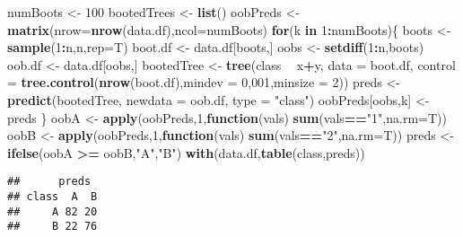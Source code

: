 \documentclass[]{article}
\newenvironment{Shaded}{\begin{snugshade}}{\end{snugshade}}
\newcommand{\ControlFlowTok}[1]{\textcolor[rgb]{0.13,0.29,0.53}{\textbf{#1}}}
\newcommand{\DataTypeTok}[1]{\textcolor[rgb]{0.13,0.29,0.53}{#1}}
\newcommand{\DecValTok}[1]{\textcolor[rgb]{0.00,0.00,0.81}{#1}}
\newcommand{\KeywordTok}[1]{\textcolor[rgb]{0.13,0.29,0.53}{\textbf{#1}}}
\newcommand{\NormalTok}[1]{#1}
\newcommand{\OperatorTok}[1]{\textcolor[rgb]{0.81,0.36,0.00}{\textbf{#1}}}
\newcommand{\StringTok}[1]{\textcolor[rgb]{0.31,0.60,0.02}{#1}}
\begin{document}
\begin{Shaded}
\begin{Highlighting}[]
\NormalTok{numBoots <-}\StringTok{ }\DecValTok{100}
\NormalTok{bootedTrees <-}\StringTok{ }\KeywordTok{list}\NormalTok{()}
\NormalTok{oobPreds <-}\StringTok{ }\KeywordTok{matrix}\NormalTok{(}\DataTypeTok{nrow=}\KeywordTok{nrow}\NormalTok{(data.df),}\DataTypeTok{ncol=}\NormalTok{numBoots) }
\ControlFlowTok{for}\NormalTok{(k }\ControlFlowTok{in} \DecValTok{1}\OperatorTok{:}\NormalTok{numBoots)\{}
\NormalTok{  boots <-}\StringTok{ }\KeywordTok{sample}\NormalTok{(}\DecValTok{1}\OperatorTok{:}\NormalTok{n,n,}\DataTypeTok{rep=}\NormalTok{T) }
\NormalTok{  boot.df <-}\StringTok{ }\NormalTok{data.df[boots,]}
\NormalTok{  oobs <-}\StringTok{ }\KeywordTok{setdiff}\NormalTok{(}\DecValTok{1}\OperatorTok{:}\NormalTok{n,boots) }
\NormalTok{  oob.df <-}\StringTok{ }\NormalTok{data.df[oobs,] }
\NormalTok{  bootedTree <-}\StringTok{ }\KeywordTok{tree}\NormalTok{(class }\OperatorTok{~}\StringTok{ }\NormalTok{x}\OperatorTok{+}\NormalTok{y,}
                     \DataTypeTok{data =}\NormalTok{ boot.df,}
                     \DataTypeTok{control =} \KeywordTok{tree.control}\NormalTok{(}\KeywordTok{nrow}\NormalTok{(boot.df),}\DataTypeTok{mindev =} \DecValTok{0}\NormalTok{,}\DecValTok{001}\NormalTok{,}\DataTypeTok{minsize =} \DecValTok{2}\NormalTok{))}
\NormalTok{  preds <-}\StringTok{ }\KeywordTok{predict}\NormalTok{(bootedTree,}
                   \DataTypeTok{newdata =}\NormalTok{ oob.df,}
                   \DataTypeTok{type =} \StringTok{"class"}\NormalTok{)}
\NormalTok{  oobPreds[oobs,k] <-}\StringTok{ }\NormalTok{preds}
\NormalTok{\}}
\NormalTok{oobA <-}\StringTok{ }\KeywordTok{apply}\NormalTok{(oobPreds,}\DecValTok{1}\NormalTok{,}\ControlFlowTok{function}\NormalTok{(vals) }\KeywordTok{sum}\NormalTok{(vals}\OperatorTok{==}\StringTok{"1"}\NormalTok{,}\DataTypeTok{na.rm=}\NormalTok{T)) }
\NormalTok{oobB <-}\StringTok{ }\KeywordTok{apply}\NormalTok{(oobPreds,}\DecValTok{1}\NormalTok{,}\ControlFlowTok{function}\NormalTok{(vals) }\KeywordTok{sum}\NormalTok{(vals}\OperatorTok{==}\StringTok{"2"}\NormalTok{,}\DataTypeTok{na.rm=}\NormalTok{T)) }
\NormalTok{preds <-}\StringTok{ }\KeywordTok{ifelse}\NormalTok{(oobA }\OperatorTok{>=}\StringTok{ }\NormalTok{oobB,}\StringTok{"A"}\NormalTok{,}\StringTok{"B"}\NormalTok{) }
\KeywordTok{with}\NormalTok{(data.df,}\KeywordTok{table}\NormalTok{(class,preds))}
\end{Highlighting}
\end{Shaded}

\begin{verbatim}
##      preds
## class  A  B
##     A 82 20
##     B 22 76
\end{verbatim}
\end{document}
